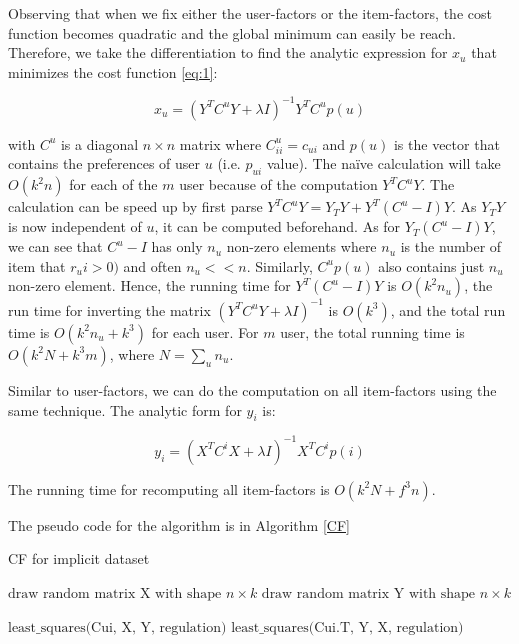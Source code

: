 Observing that when we fix either the user-factors or the item-factors, the cost function becomes quadratic and the global minimum can easily be reach. Therefore, we take the differentiation to find the analytic expression for \(x_u\) that minimizes the cost function \eqref{eq:1}:

\begin{displaymath}
x_u = (Y^T C^u Y + \lambda I)^{-1} Y^T C^u p(u)
\end{displaymath}

with \(C^u\) is a diagonal \(n \times n\) matrix where \(C^u_{ii} = c_{ui}\) and \(p(u)\) is the vector that contains the preferences of user \(u\) (i.e. \(p_{ui}\) value). The na\"ive calculation will take \(O(k^2n) \) for each of the \(m\) user because of the computation \(Y^T C^u Y\). The calculation can be speed up by first parse \(Y^T C^u Y = Y_TY + Y^T (C^u - I) Y \). As \(Y_TY\) is now independent of \(u\), it can be computed beforehand. As for \(Y_T (C^u - I)Y\), we can see that \(C^u - I\) has only \(n_u\) non-zero elements where \(n_u\) is the number of item that \(r_ui > 0) \) and often \(n_u << n\). Similarly, \(C^u p(u)\) also contains just \(n_u\) non-zero element. Hence, the running time for \(Y^T (C^u - I) Y\) is \(O(k^2 n_u)\), the run time for inverting the matrix \( (Y^T C^u Y + \lambda I)^{-1} \) is \(O(k^3) \), and the total run time is \(O(k^2 n_u + k^3)\) for each user. For \(m\) user, the total running time is \(O(k^2 N + k^3 m)\), where \(N = \sum_u n_u\). \hfill \break

\noindent Similar to user-factors, we can do the computation on all item-factors using the same technique. The analytic form for \(y_i\) is:

\begin{displaymath}
y_i = (X^T C^i X + \lambda I)^{-1} X^T C^i p(i)
\end{displaymath}

\noindent The running time for recomputing all item-factors is \(O(k^2 N + f^3n)\). \hfill \break

\noindent The pseudo code for the algorithm is in Algorithm \eqref{CF}

\begin{algorithm}
\caption{CF for implicit dataset} \label{CF}
\begin{algorithmic}[1]
 
	\State $\text{draw random matrix X with shape } n \times k $ 
	\State $\text{draw random matrix Y with shape } n \times k $
	
		\State $\text{least_squares(Cui, X, Y, regulation)}$
		\State $\text{least_squares(Cui.T, Y, X, regulation)}$	
	\EndFor
	\Return [w, b]
\EndFunction
\end{algorithmic}
\end{algorithm}

